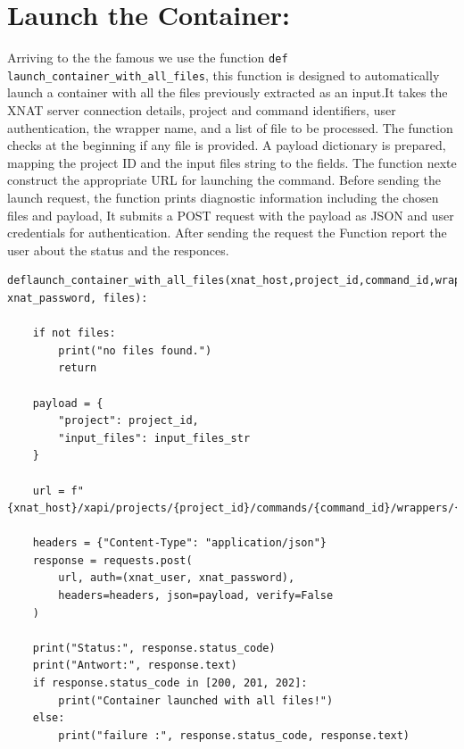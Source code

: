 \section{Launch the Container:}
Arriving to the the famous we use the function \texttt{def launch\_container\_with\_all\_files}, this function is designed to automatically launch a container with all the files previously extracted as an input.It takes the XNAT server connection details, project and command identifiers, user authentication, the wrapper name, and a list of file to be processed. The function checks at the beginning if any file is provided. A payload dictionary is prepared, mapping the project ID and the input files string to the fields. The function nexte construct the appropriate URL for launching the command. Before sending the launch request, the function prints diagnostic information including the chosen files and payload, It submits a POST request with the payload as JSON and user credentials for authentication. After sending the request the Function report the user about the status and the responces.



\begin{lstlisting}
deflaunch_container_with_all_files(xnat_host,project_id,command_id,wrapper_name,xnat_user, xnat_password, files):
   
    if not files:
        print("no files found.")
        return 

    payload = {
        "project": project_id,
        "input_files": input_files_str
    }

    url = f"{xnat_host}/xapi/projects/{project_id}/commands/{command_id}/wrappers/{wrapper_name}/root/project/launch"

    headers = {"Content-Type": "application/json"}
    response = requests.post(
        url, auth=(xnat_user, xnat_password),
        headers=headers, json=payload, verify=False
    )

    print("Status:", response.status_code)
    print("Antwort:", response.text)
    if response.status_code in [200, 201, 202]:
        print("Container launched with all files!")
    else:
        print("failure :", response.status_code, response.text)
\end{lstlisting}




















